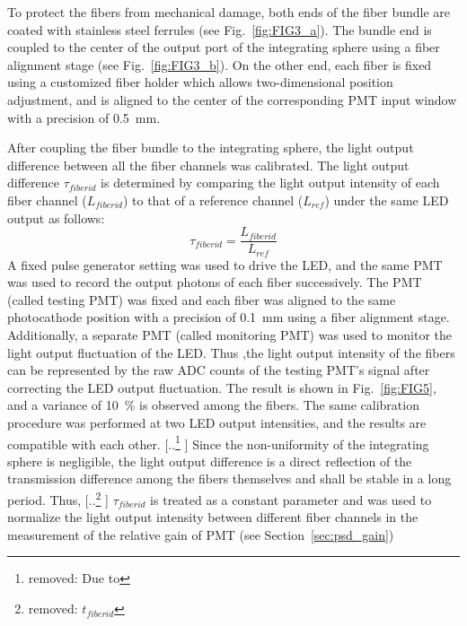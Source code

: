 \documentclass{nst}
\providecommand{\DIFadd}[1]{{\protect\color{blue} \sf #1}} %
\providecommand{\DIFdel}[1]{{\protect\color{red} [..\footnote{removed: #1} ]}} %
\providecommand{\DIFaddbegin}{} %
\providecommand{\DIFaddend}{} %
\providecommand{\DIFdelbegin}{} %
\providecommand{\DIFdelend}{} %
\begin{document}
To protect the fibers from mechanical damage, both ends of the fiber bundle are coated with stainless steel ferrules (see Fig.~\ref{fig:FIG3_a}).
The bundle end is coupled to the center of the output port of the integrating sphere using a fiber alignment stage (see Fig.~\ref{fig:FIG3_b}).
On the other end, each fiber is fixed using a customized fiber holder which allows two-dimensional position adjustment, and is aligned to the center of the corresponding PMT input window with a precision of \SI{0.5}{\milli\meter}.

After coupling the fiber bundle to the integrating sphere, the light output difference between all the fiber channels was calibrated. 
The light output difference $\tau_{fiberid}$ is determined by comparing the light output intensity of each fiber channel ($L_{fiberid}$) to that of a reference channel ($L_{ref}$) under the same LED output as follows:
\begin{equation}
	\tau_{fiberid} = \frac{L_{fiberid}}{L_{ref}}
\end{equation} 
A fixed pulse generator setting was used to drive the LED, and the same PMT was used to record the output photons of each fiber successively.
The PMT (called testing PMT) was fixed and each fiber was aligned to the same photocathode position with a precision of \SI{0.1}{\milli\meter} using a fiber alignment stage.
Additionally, a separate PMT (called monitoring PMT) was used to monitor the light output fluctuation of the LED.
Thus ,the light output intensity of the fibers can be represented by the raw ADC counts of the testing PMT's signal after correcting the LED output fluctuation.
The result is shown in Fig.~\ref{fig:FIG5}, and a variance of \SI{10}{\percent} is observed among the fibers.
The same calibration procedure was performed at two LED output intensities, and the results are compatible with each other. 
\DIFdelbegin \DIFdel{Due to }\DIFdelend \DIFaddbegin \DIFadd{Since }\DIFaddend the non-uniformity of the integrating sphere is negligible, the light output difference is a direct reflection of the transmission difference among the fibers themselves and shall be stable in a long period.
Thus, \DIFdelbegin \DIFdel{$t_{fiberid}$ }\DIFdelend \DIFaddbegin \DIFadd{$\tau_{fiberid}$ }\DIFaddend is treated as a constant parameter and was used to normalize the light output intensity between different fiber channels in the measurement of the relative gain of PMT (see Section~\ref{sec:psd_gain})
\end{document}
